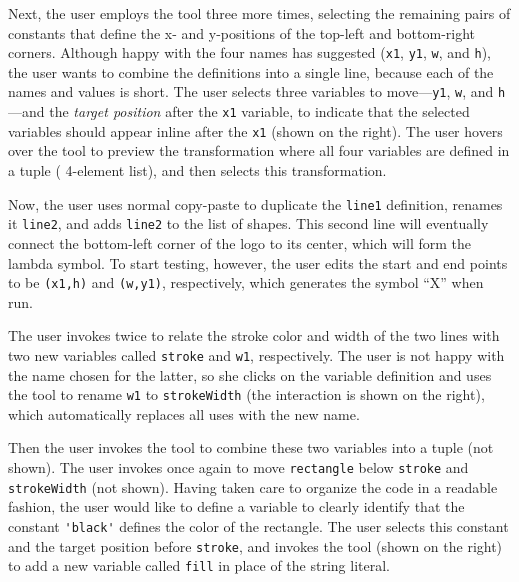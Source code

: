 


Next, the user employs the  tool three more times, selecting the
remaining pairs of constants that define the x- and y-positions of the
top-left and bottom-right corners. Although happy with the four
names \deuce{} has suggested (\verb+x1+, \verb+y1+, \verb+w+, and
\verb+h+), the user wants to combine the
definitions into a single line, because each of the names and values is
short.
%
The user selects three variables to move---\verb+y1+,
\verb+w+, and \verb+h+---and the \emph{target position} after the
\verb+x1+ variable, to indicate that the selected variables should
appear inline after the \verb+x1+ (shown on the right).
The user hovers over the  tool to preview the transformation where all four
variables are defined in a tuple (\ie{} 4-element list), and then
selects this transformation.

Now, the user uses normal copy-paste to duplicate the \verb+line1+ definition,
renames it \verb+line2+, and adds \verb+line2+ to the list of shapes.
This second line will eventually connect the bottom-left corner of the
logo to its center, which will form the lambda symbol.
To start testing, however,
the user edits the start and end points to be \verb+(x1,h)+ and
\verb+(w,y1)+, respectively, which generates the symbol ``X'' when run.


The user invokes
 twice to relate the stroke color and width of the two
lines with two new variables called \verb+stroke+ and \verb+w1+,
respectively.
The user is not happy with the name chosen for the latter, so
she clicks on the variable definition and uses the  tool to rename
\verb+w1+ to \verb+strokeWidth+ (the interaction is shown on the
right), which automatically replaces all uses with the new name.


Then the user invokes the  tool to combine these two
variables into a tuple (not shown). The user invokes 
once again
to move \verb+rectangle+ below \verb+stroke+ and \verb+strokeWidth+ (not shown).
Having taken care to organize the code in a readable fashion, the
user would like to define a variable to clearly identify that the
constant \verb+'black'+ defines the color of the rectangle. The user
selects this constant and the target position before \verb+stroke+,
and invokes the  tool (shown on the right) to add a
new variable called \verb+fill+ in place of the string literal.


